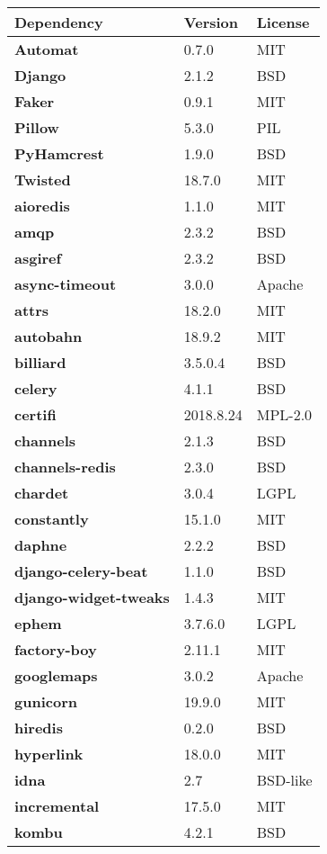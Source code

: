 \begin{longtable}{| p{} | p{} | p{} |}
\hline
\textbf{Dependency} & \textbf{Version} & \textbf{License} \\ \hline
\textbf{Automat} & 0.7.0 & MIT \\
\textbf{Django} & 2.1.2 & BSD \\
\textbf{Faker} & 0.9.1 & MIT \\
\textbf{Pillow} & 5.3.0 & PIL \\
\textbf{PyHamcrest} & 1.9.0 & BSD \\
\textbf{Twisted} & 18.7.0 & MIT \\
\textbf{aioredis} & 1.1.0 & MIT \\
\textbf{amqp} & 2.3.2 & BSD \\
\textbf{asgiref} & 2.3.2 & BSD \\
\textbf{async-timeout} & 3.0.0 & Apache \\
\textbf{attrs} & 18.2.0 & MIT \\
\textbf{autobahn} & 18.9.2 & MIT \\
\textbf{billiard} & 3.5.0.4 & BSD \\
\textbf{celery} & 4.1.1 & BSD \\
\textbf{certifi} & 2018.8.24 & MPL-2.0 \\
\textbf{channels} & 2.1.3 & BSD \\
\textbf{channels-redis} & 2.3.0 & BSD \\
\textbf{chardet} & 3.0.4 & LGPL \\
\textbf{constantly} & 15.1.0 & MIT \\
\textbf{daphne} & 2.2.2 & BSD \\
\textbf{django-celery-beat} & 1.1.0 & BSD \\
\textbf{django-widget-tweaks} & 1.4.3 & MIT \\
\textbf{ephem} & 3.7.6.0 & LGPL \\
\textbf{factory-boy} & 2.11.1 & MIT \\
\textbf{googlemaps} & 3.0.2 & Apache \\
\textbf{gunicorn} & 19.9.0 & MIT \\
\textbf{hiredis} & 0.2.0 & BSD \\
\textbf{hyperlink} & 18.0.0 & MIT \\
\textbf{idna} & 2.7 & BSD-like \\
\textbf{incremental} & 17.5.0 & MIT \\
\textbf{kombu} & 4.2.1 & BSD \\

\end{longtable}
